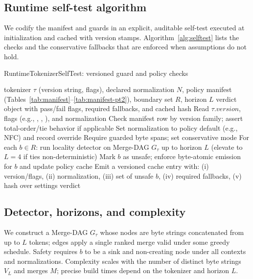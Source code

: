 \documentclass{article}
\def\mathcal#1{#1}%
\def\mathrm#1{#1}%
\begin{document}
\subsection{Runtime self-test algorithm}\label{sec:selftest}
We codify the manifest and guards in an explicit, auditable self-test executed at initialization and cached with version stamps. Algorithm~\ref{alg:selftest} lists the checks and the conservative fallbacks that are enforced when assumptions do not hold.

\begin{algorithm}[h]
\caption{RuntimeTokenizerSelfTest: versioned guard and policy checks}
\label{alg:selftest}
\begin{algorithmic}[1]
\Require tokenizer $\tau$ (version string, flags), declared normalization $\mathcal{N}$, policy manifest (Tables~\ref{tab:manifest}--\ref{tab:manifest-pt2}), boundary set $\mathcal{R}$, horizon $L$
\Ensure verdict object with pass/fail flags, required fallbacks, and cached hash
\State Read $\tau.\mathrm{version}$, flags (e.g., , , ), and normalization
\State Check manifest row by version family; assert total-order/tie behavior if applicable
  \State Set normalization to policy default (e.g., NFC) and record override
\EndIf
{}
  \State Require guarded byte spans; set conservative mode
\EndIf
\State For each $b\in\mathcal{R}$: run locality detector on Merge-DAG $G_\tau$ up to horizon $L$ (elevate to $L{=}4$ if ties non-deterministic)
  \State Mark $b$ as unsafe; enforce byte-atomic emission for $b$ and update policy cache
\EndIf
\State Emit a versioned cache entry with: (i) version/flags, (ii) normalization, (iii) set of unsafe $b$, (iv) required fallbacks, (v) hash over settings
\State \Return verdict
\end{algorithmic}
\end{algorithm}

\subsection{Detector, horizons, and complexity}\label{sec:detector}
We construct a Merge-DAG $G_\tau$ whose nodes are byte strings concatenated from up to $L$ tokens; edges apply a single ranked merge valid under some greedy schedule. Safety requires $b$ to be a sink and non-creating node under all contexts and normalizations. Complexity scales with the number of distinct byte strings $V_L$ and merges $M$; precise build times depend on the tokenizer and horizon $L$.
\end{document}
